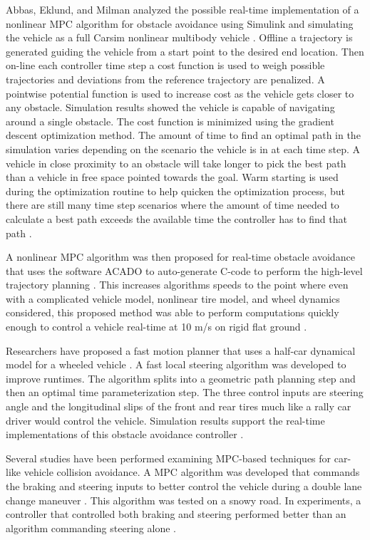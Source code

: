 \documentclass[12pt,onecolumn]{report}
\begin{document}
Abbas, Eklund, and Milman analyzed the possible real-time implementation of a nonlinear MPC algorithm for obstacle avoidance using Simulink and simulating the vehicle as a full Carsim nonlinear multibody vehicle \cite{Abbas&Eklund2012}. Offline a trajectory is generated guiding the vehicle from a start point to the desired end location. Then on-line each controller time step a cost function is used to weigh possible trajectories and deviations from the reference trajectory are penalized. A pointwise potential function is used to increase cost as the vehicle gets closer to any obstacle. Simulation results showed the vehicle is capable of navigating around a single obstacle. The cost function is minimized using the gradient descent optimization method. The amount of time to find an optimal path in the simulation varies depending on the scenario the vehicle is in at each time step. A vehicle in close proximity to an obstacle will take longer to pick the best path than a vehicle in free space pointed towards the goal. Warm starting is used during the optimization routine to help quicken the optimization process, but there are still many time step scenarios where the amount of time needed to calculate a best path exceeds the available time the controller has to find that path \cite{Abbas&Eklund2012}.

A nonlinear MPC algorithm was then proposed for real-time obstacle avoidance that uses the software ACADO to auto-generate C-code to perform the high-level trajectory planning \cite{Frasch&Gray2013}. This increases algorithms speeds to the point where even with a complicated vehicle model, nonlinear tire model, and wheel dynamics considered, this proposed method was able to perform computations quickly enough to control a vehicle real-time at 10 m/s on rigid flat ground \cite{Frasch&Gray2013}.

Researchers have proposed a fast motion planner that uses a half-car dynamical model for a wheeled vehicle \cite{Jeon&Cowlagi2013}. A fast local steering algorithm was developed to improve runtimes. The algorithm splits into a geometric path planning step and then an optimal time parameterization step. The three control inputs are steering angle and the longitudinal slips of the front and rear tires much like a rally car driver would control the vehicle. Simulation results support the real-time implementations of this obstacle avoidance controller \cite{Jeon&Cowlagi2013}.

Several studies have been performed examining MPC-based techniques for car-like vehicle collision avoidance. A MPC algorithm was developed that commands the braking and steering inputs to better control the vehicle during a double lane change maneuver \cite{Falcone2007}. This algorithm was tested on a snowy road. In experiments, a controller that controlled both braking and steering performed better than an algorithm commanding steering alone \cite{Falcone2007}.
\end{document}
